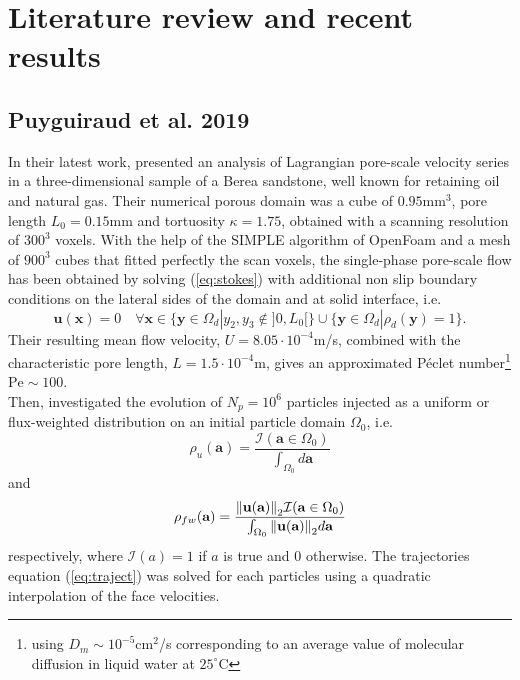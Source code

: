 \section{Literature review and recent results}
\subsection{Puyguiraud et al. 2019}
In their latest work, \citet{Puyguiraud2019} presented an analysis of Lagrangian pore-scale velocity series in a three-dimensional sample of a Berea sandstone, well known for retaining oil and natural gas.
Their numerical porous domain was a cube of $0.95$mm$^3$, pore length $L_0=0.15$mm and tortuosity $\kappa=1.75$, obtained with a scanning resolution of $300^3$ voxels. 
With the help of the SIMPLE algorithm of OpenFoam and a mesh of $900^3$ cubes that fitted perfectly the scan voxels, the single-phase pore-scale flow has been obtained by solving (\ref{eq:stokes}) with additional non slip boundary conditions on the lateral sides of the domain and at solid interface, i.e.
\begin{equation}\label{eq:nonslip_sideBC}
\textbf{u}(\textbf{x})=0 \quad\forall \textbf{x}\in \{\textbf{y}\in\Omega_d|y_2,y_3\notin]0,L_0[\}\cup\{\textbf{y}\in\Omega_d|\rho_d(\textbf{y})=1\}.
\end{equation}
Their resulting mean flow velocity, $U=8.05\cdot 10^{-4}$m/s, combined with the characteristic pore length, $L=1.5\cdot10^{-4}$m, gives an approximated Péclet number\footnote{using $D_m\sim10^{-5}$cm$^2$/s corresponding to an average value of molecular diffusion in liquid water at $25^\circ$C} $\mathrm{Pe}\sim100$. \\
Then, \citeauthor{Puyguiraud2019} investigated the evolution of $N_p=10^6$ particles injected as a uniform or flux-weighted distribution on an initial particle domain $\Omega_0$, i.e.
\begin{equation}\label{eq:unif_distr}
\rho_u(\textbf{a})=\frac{\mathcal{I}(\textbf{a}\in\Omega_0)}{\int_{\Omega_0} d\textbf{a}}
\end{equation}
and
\begin{equation}\label{eq:flux_weighted}
\rho_{fw}(\textbf{a})=\frac{\norm{\textbf{u}(\textbf{a})}_2\mathcal{I}(\textbf{a}\in\Omega_0)}{\int_{\Omega_0} \norm{\textbf{u}(\textbf{a})}_2 d\textbf{a}}
\end{equation}
respectively, where $\mathcal{I}(a)=1$ if $a$ is true and $0$ otherwise. 
The trajectories equation (\ref{eq:traject}) was solved for each particles using a quadratic interpolation of the face velocities.
